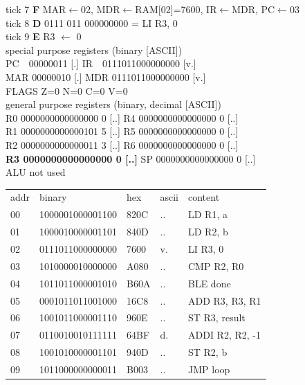 \noindent\begin{tcolorbox}[stepbox, title={Instruction 3 \hfill ticks 7 to 9 \quad LI R3, 0}]
\textcolor{dim}{tick 7} \textbf{F} MAR$\leftarrow$02, MDR$\leftarrow$RAM[02]=7600, IR$\leftarrow$MDR, PC$\leftarrow$03\\
\textcolor{dim}{tick 8} \textbf{D} 0111 011 000000000 = LI R3, 0\\
\textcolor{dim}{tick 9} \textbf{E} R3 $\leftarrow$ 0\\[2pt]
\textcolor{dim}{special purpose registers (binary [ASCII])}\\
PC~~00000011 [.] \hfill IR~~0111011000000000 [v.]\\
MAR 00000010 [.] \hfill MDR 0111011000000000 [v.]\\
FLAGS Z=0 N=0 C=0 V=0\\[2pt]
\textcolor{dim}{general purpose registers (binary, decimal [ASCII])}\\
R0 0000000000000000 0 [..] \hfill R4 0000000000000000 0 [..]\\
R1 0000000000000101 5 [..] \hfill R5 0000000000000000 0 [..]\\
R2 0000000000000011 3 [..] \hfill R6 0000000000000000 0 [..]\\
\textcolor{wrt}{\textbf{R3 0000000000000000 0 [..]}} \hfill SP 0000000000000000 0 [..]\\
\textcolor{dim}{ALU not used}\\[2pt]
{\setlength{\tabcolsep}{2pt}\begin{tabular}{@{}lllll@{}}
\textcolor{dim}{addr} & \textcolor{dim}{binary} & \textcolor{dim}{hex} & \textcolor{dim}{ascii} & \textcolor{dim}{content}\\
00 & 1000001000001100 & 820C & .. & LD R1, a\\
01 & 1000010000001101 & 840D & .. & LD R2, b\\
02 & 0111011000000000 & 7600 & v. & LI R3, 0\\
\rowcolor{pcc}03 & 1010000010000000 & A080 & .. & CMP R2, R0\\
04 & 1011011000001010 & B60A & .. & BLE done\\
05 & 0001011011001000 & 16C8 & .. & ADD R3, R3, R1\\
06 & 1001011000001110 & 960E & .. & ST R3, result\\
07 & 0110010010111111 & 64BF & d. & ADDI R2, R2, -1\\
08 & 1001010000001101 & 940D & .. & ST R2, b\\
09 & 1011000000000011 & B003 & .. & JMP loop\\

\end{tabular}}
\end{tcolorbox}
